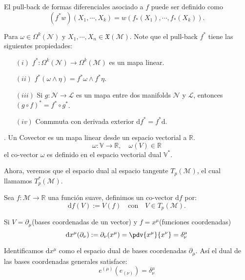 \documentclass[../main]{subfiles}
\begin{document}
El pull-back de formas diferenciales asociado a $f$ puede ser definido como 
\begin{equation}
    (f^* w)(X_1, \cdots, X_k)=w\left(f_*(X_1), \cdots, f_*(X_k)\right).
\end{equation}

Para $\omega \in \Omega^k(\mathcal{N})$ y $X_1, \cdots, X_n \in \mathfrak{X}(\mathcal{M})$. Note que el pull-back $f^*$ tiene las siguientes propiedades:
\begin{enumerate}
    \item[$(i)$] $f^*: \Omega^k(\mathcal{N}) \rightarrow \Omega^k(\mathcal{M})$ es un mapa linear.
    \item[$(ii)$] $f^*(\omega \wedge \eta)=f^* \omega \wedge f^* \eta$.
    \item[$(iii)$] Si $g: \mathcal{N}\rightarrow \mathcal{L}$ es un mapa entre dos manifolds $\mathcal{N}$ y $\mathcal{L}$, entonces $(g \circ f)^*=f^* \circ g^*$.
    \item[$(iv)$] Conmmuta con derivada exterior $\mathrm{d}f^*=f^* \mathrm{d}$. 
\end{enumerate}

. Un Covector es un mapa linear desde un espacio vectorial a $\mathbb{R}$.
\begin{equation}
    \omega: \mathbb{V} \rightarrow \mathbb{R}, \quad \omega(V)\in \mathbb{R}
\end{equation}
el co-vector $\omega$ es definido en el espacio vectorial dual $\mathbb{V}^*$.

Ahora, veremos que el espacio dual al espacio tangente $T_p(\mathcal{M})$, el cual llamamos $T^*_p(\mathcal{M})$.

Sea $f:\mathcal{M}\rightarrow \mathbb{R}$ una función suave, definimos un co-vector $\mathrm{d}f$ por:
\begin{equation}
    \mathrm{d}f(V):=V(f) \quad \text{con} \quad V\in T_p(\mathcal{M}).
\end{equation}

Si $V=\partial_{\mu}$(bases coordenadas de un vector) y $f=x^{\mu}$(funciones coordenadas)
\begin{equation}
    \mathrm{d}x^{\mu}(\partial_{\nu}):=\partial_{\nu}(x^{\mu})=\pdv{x^{\mu}}{x^{\nu}}=\delta^{\mu}_{\nu}
\end{equation}

Identificamos $\mathrm{d}x^{\mu}$ como el espacio dual de bases coordenadas $\partial_{\mu}$. Así el dual de las bases coordenadas generales satisface:
\begin{equation}
    e^{(\mu)}(e_{(\nu)})=\delta^{\mu}_{\nu}
\end{equation}
\end{document}
